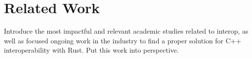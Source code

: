 \section{Related Work}

Introduce the most impactful and relevant academic studies related to interop, as well as focused ongoing work in the industry to find a proper solution for C++ interoperability with Rust. Put this work into perspective.

